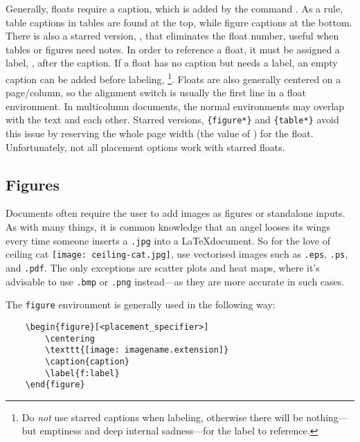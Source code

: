 Generally, floats require a caption, which is added by the command
.  As a rule, table captions in tables are found at
the top, while figure captions at the bottom.  There is also a starred
version, , that eliminates the float number, useful
when tables or figures need notes.  In order to reference a float, it
must be assigned a label, , after the caption.  If a
float has no caption but needs a label, an empty caption can be added
before labeling, \footnote{Do \emph{not}
  use starred captions when labeling, otherwise there will be
  nothing---but emptiness and deep internal sadness---for the label to
  reference.}.  Floats are also generally centered on a page/column,
so the  alignment switch is usually the first line in
a float environment.  In multicolumn documents, the normal
environments may overlap with the text and each other.  Starred
versions, \verb|{figure*}| and \verb|{table*}| avoid this issue by
reserving the whole page width (the value of ) for the
float.  Unfortunately, not all placement options work with starred
floats.
%
\subsection{Figures}
%
Documents often require the user to add images as figures or
standalone inputs.  As with many things, it is common knowledge that
an angel looses its wings every time someone inserts a \texttt{.jpg}
into a \LaTeX document.  So for the love of ceiling
cat \texttt{[image: ceiling-cat.jpg]}, use vectorised
images such as \texttt{.eps}, \texttt{.ps}, and \texttt{.pdf}.  The
only exceptions are scatter plots and heat maps, where it's advisable
to use \texttt{.bmp} or \texttt{.png} instead---as they are more
accurate in such cases.

The \verb|figure| environment is generally used in the following way:
\begin{verbatim}
	\begin{figure}[<placement_specifier>]
	    \centering
	    \texttt{[image: imagename.extension]}
	    \caption{caption}
	    \label{f:label}
	\end{figure}
\end{verbatim}

